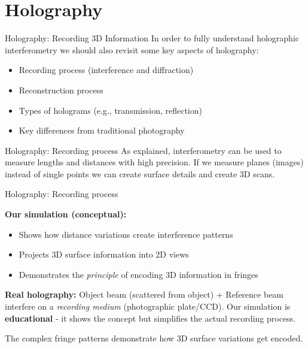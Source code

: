 \documentclass{beamer}
\begin{document}
\section{Holography}
\begin{frame}{Holography: Recording 3D Information}
    In order to fully  understand holographic interferometry we should also revisit some key aspects of holography:
    \begin{itemize}
        \item Recording process (interference and diffraction)
        \item Reconstruction process
        \item Types of holograms (e.g., transmission, reflection)
        \item Key differences from traditional photography
    \end{itemize}
\end{frame}
\begin{frame}{Holography: Recording process}
As explained, interferometry can be used to measure lengths and distances with high precision. If we measure planes (images) instead of single points we can create surface details and create 3D scans.
\end{frame}
\begin{frame}{Holography: Recording process}

\textbf{Our simulation (conceptual):}
\begin{itemize}
    \item Shows how distance variations create interference patterns
    \item Projects 3D surface information into 2D views
    \item Demonstrates the \textit{principle} of encoding 3D information in fringes
\end{itemize}

\vspace{0.3em}

\textbf{Real holography:} Object beam (scattered from object) + Reference beam interfere on a \textit{recording medium} (photographic plate/CCD). Our simulation is \textbf{educational} - it shows the concept but simplifies the actual recording process.

\vspace{0.3em}

The complex fringe patterns demonstrate how 3D surface variations get encoded.
\end{frame}
\end{document}
